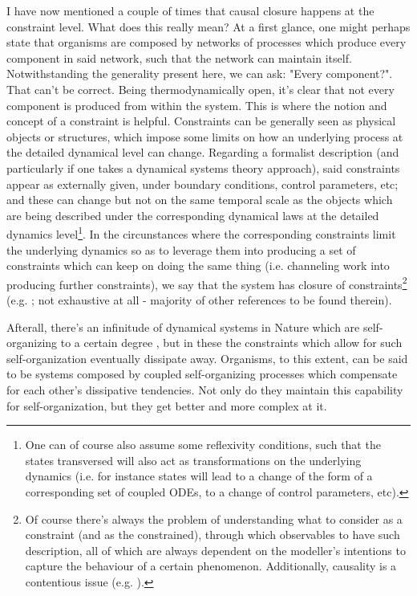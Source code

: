 \documentclass[a4paper,12pt,twoside,leqno]{article}
\begin{document}
I have now mentioned a couple of times that causal closure happens at the constraint level. What does this really mean? At a first glance, one might perhaps state that organisms are composed by networks of processes which produce every component in said network, such that the network can maintain itself. Notwithstanding the generality present here, we can ask: "Every component?". That can't be correct. Being thermodynamically open, it's clear that not every component is produced from within the system. This is where the notion and concept of a constraint is helpful. Constraints can be generally seen as physical objects or structures, which impose some limits on how an underlying process at the detailed dynamical level can change. Regarding a formalist description (and particularly if one takes a dynamical systems theory approach), said constraints appear as externally given, under boundary conditions, control parameters, etc; and these can change but not on the same temporal scale as the objects which are being described under the corresponding dynamical laws at the detailed dynamics level\footnote{One can of course also assume some reflexivity conditions, such that the states transversed will also act as transformations on the underlying dynamics (i.e. for instance states will lead to a change of the form of a corresponding set of coupled ODEs, to a change of control parameters, etc).}. In the circunstances where the corresponding constraints limit the underlying dynamics so as to leverage them into producing a set of constraints which can keep on doing the same thing (i.e. channeling work into producing further constraints), we say that the system has closure of constraints\footnote{Of course there's always the problem of understanding what to consider as a constraint (and as the constrained), through which observables to have such description, all of which are always dependent on the modeller's intentions to capture the behaviour of a certain phenomenon. Additionally, causality is a contentious issue (e.g. \cite{mossio2013emergence, craver2007top}).} (e.g. \cite{montevil2015biological, moreno2015biological, mossio2013emergence}; not exhaustive at all - majority of other references to be found therein).

Afterall, there's an infinitude of dynamical systems in Nature which are self-organizing to a certain degree \citep{glansdorff1973thermodynamic}, but in these the constraints which allow for such self-organization eventually dissipate away. Organisms, to this extent, can be said to be systems composed by coupled self-organizing processes which compensate for each other’s dissipative tendencies. Not only do they maintain this capability for self-organization, but they get better and more complex at it.
\end{document}
